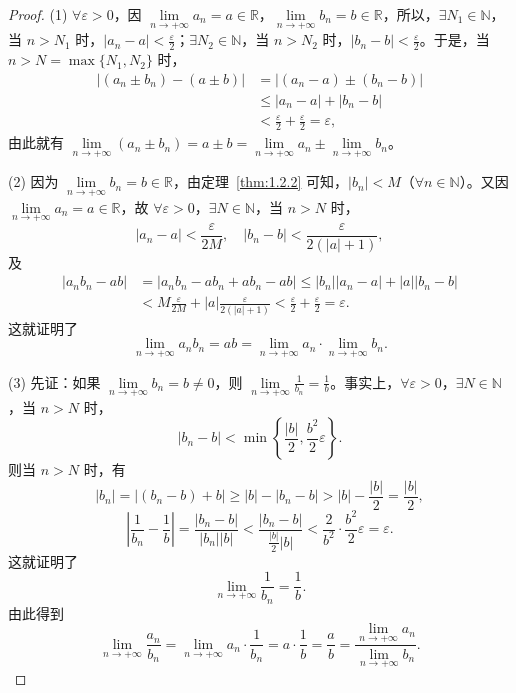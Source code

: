\begin{proof}
(1) $\forall \varepsilon > 0$，因 $\lim\limits_{n \to +\infty} a_n = a \in \mathbb{R}$，$\lim\limits_{n \to +\infty} b_n = b \in \mathbb{R}$，所以，$\exists N_1 \in \mathbb{N}$，当 $n > N_1$ 时，$|a_n - a| < \frac{\varepsilon}{2}$；$\exists N_2 \in \mathbb{N}$，当 $n > N_2$ 时，$|b_n - b| < \frac{\varepsilon}{2}$。于是，当 $n > N = \max\{N_1, N_2\}$ 时，
\begin{align*}
|(a_{n}\pm b_{n})-(a\pm b)| &= |(a_{n}-a)\pm(b_{n}-b)| \\
&\leqslant |a_{n}-a| + |b_{n}-b| \\
&< \frac{\varepsilon}{2} + \frac{\varepsilon}{2} = \varepsilon,
\end{align*}
由此就有 $\lim\limits_{n\to+\infty}(a_n\pm b_n) = a\pm b = \lim\limits_{n\to+\infty}a_n \pm \lim\limits_{n\to+\infty}b_n$。

(2) 因为 $\lim\limits_{n \to +\infty} b_n = b \in \mathbb{R}$，由定理~\ref{thm:1.2.2} 可知，$|b_n| < M$（$\forall n \in \mathbb{N}$）。又因 $\lim\limits_{n \to +\infty} a_n = a \in \mathbb{R}$，故 $\forall \varepsilon > 0$，$\exists N \in \mathbb{N}$，当 $n > N$ 时，
\[
|a_{n}-a| < \frac{\varepsilon}{2M},\quad |b_{n}-b| < \frac{\varepsilon}{2(|a|+1)},
\]
及
\begin{align*}
|a_{n}b_{n}-ab| &= |a_{n}b_{n}-ab_{n}+ab_{n}-ab| \leqslant |b_{n}||a_{n}-a| + |a||b_{n}-b| \\
&< M \frac{\varepsilon}{2M} + |a| \frac{\varepsilon}{2(|a|+1)} < \frac{\varepsilon}{2} + \frac{\varepsilon}{2} = \varepsilon.
\end{align*}
这就证明了
\[
\lim_{n\to+\infty}a_nb_n = ab = \lim_{n\to+\infty}a_n \cdot \lim_{n\to+\infty}b_n.
\]

(3) 先证：如果 $\lim\limits_{n\to+\infty}b_n=b\neq0$，则 $\lim\limits_{n\to+\infty}\frac{1}{b_n}=\frac{1}{b}$。事实上，$\forall\varepsilon>0$，$\exists N\in\mathbb{N}$，当 $n>N$ 时，
\[
|b_{n}-b| < \min\left\{\frac{|b|}{2}, \frac{b^{2}}{2}\varepsilon\right\}.
\]
则当 $n > N$ 时，有
\[
|b_{n}| = |(b_{n}-b)+b| \geqslant |b| - |b_{n}-b| > |b| - \frac{|b|}{2} = \frac{|b|}{2},
\]
\[
\left|\frac{1}{b_{n}}-\frac{1}{b}\right| = \frac{|b_{n}-b|}{|b_{n}||b|} < \frac{|b_{n}-b|}{\frac{|b|}{2}|b|} < \frac{2}{b^{2}} \cdot \frac{b^{2}}{2}\varepsilon = \varepsilon.
\]
这就证明了
\[
\lim_{n\to+\infty}\frac{1}{b_{n}} = \frac{1}{b}.
\]
由此得到
\[
\lim_{n\to+\infty}\frac{a_{n}}{b_{n}} = \lim_{n\to+\infty}a_{n} \cdot \frac{1}{b_{n}} = a \cdot \frac{1}{b} = \frac{a}{b} = \frac{\lim\limits_{n\to+\infty}a_{n}}{\lim\limits_{n\to+\infty}b_{n}}.
\]
\end{proof}

